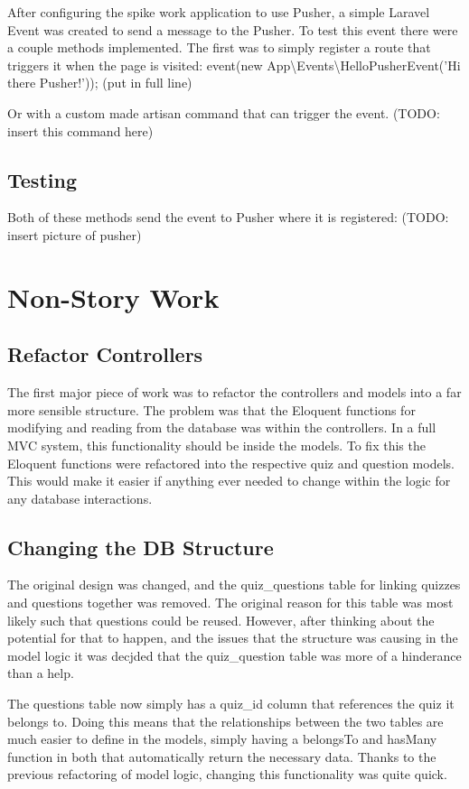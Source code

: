 \documentclass{article}
\begin{document}
After configuring the spike work application to use Pusher, a simple Laravel Event was created to send a message to the Pusher. To test this event there were a couple methods implemented. The first was to simply register a route that triggers it when the page is visited: 
	event(new App\textbackslash Events\textbackslash HelloPusherEvent('Hi there Pusher!')); (put in full line)
 
Or with a custom made artisan command that can trigger the event. (TODO: insert this command here)
 
\subsection{Testing}
Both of these methods send the event to Pusher where it is registered: (TODO: insert picture of pusher)
\newpage

\section{Non-Story Work}
\subsection{Refactor Controllers}
The first major piece of work was to refactor the controllers and models into a far more sensible structure. The problem was that the Eloquent functions for modifying and reading from the database was within the controllers. In a full MVC system, this functionality should be inside the models. To fix this the Eloquent functions were refactored into the respective quiz and question models. This would make it easier if anything ever needed to change within the logic for any database interactions.
\subsection{Changing the DB Structure}
The original design was changed, and the quiz\_questions table for linking quizzes and questions together was removed. The original reason for this table was most likely such that questions could be reused. However, after thinking about the potential for that to happen, and the issues that the structure was causing in the model logic it was decjded that the quiz\_question table was more of a hinderance than a help.

The questions table now simply has a quiz\_id column that references the quiz it belongs to. Doing this means that the relationships between the two tables are much easier to define in the models, simply having a belongsTo and hasMany function in both that automatically return the necessary data. Thanks to the previous refactoring of model logic, changing this functionality was quite quick.
\end{document}
